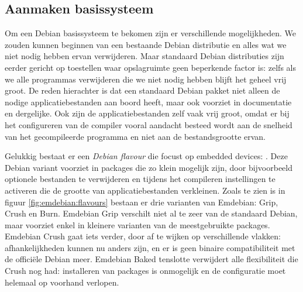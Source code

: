 \subsection{Aanmaken basissysteem}
\label{kiosk:deployment:besturingssysteem:basissysteem}

Om een Debian basissysteem te bekomen zijn er verschillende mogelijkheden. We zouden kunnen beginnen van een bestaande Debian distributie en alles wat we niet nodig hebben ervan verwijderen. Maar standaard Debian distributies zijn eerder gericht op toestellen waar opslagruimte geen beperkende factor is: zelfs als we alle programmas verwijderen die we niet nodig hebben blijft het geheel vrij groot. De reden hierachter is dat een standaard Debian pakket niet alleen de nodige applicatiebestanden aan boord heeft, maar ook voorziet in documentatie en dergelijke. Ook zijn de applicatiebestanden zelf vaak vrij groot, omdat er bij het configureren van de compiler vooral aandacht besteed wordt aan de snelheid van het gecompileerde programma en niet aan de bestandsgrootte ervan.

Gelukkig bestaat er een \emph{Debian flavour} die focust op embedded devices: . Deze Debian variant voorziet in packages die zo klein mogelijk zijn, door bijvoorbeeld optionele bestanden te verwijderen en tijdens het compileren instellingen te activeren die de grootte van applicatiebestanden verkleinen. Zoals te zien is in figuur \ref{fig:emdebian:flavours} bestaan er drie varianten van Emdebian: Grip, Crush en Burn. Emdebian Grip verschilt niet al te zeer van de standaard Debian, maar voorziet enkel in kleinere varianten van de meestgebruikte packages. Emdebian Crush gaat iets verder, door af te wijken op verschillende vlakken: afhankelijkheden kunnen nu anders zijn, en er is geen binaire compatibiliteit met de officiële Debian meer. Emdebian Baked tenslotte verwijdert alle flexibiliteit die Crush nog had: installeren van packages is onmogelijk en de configuratie moet helemaal op voorhand verlopen.

